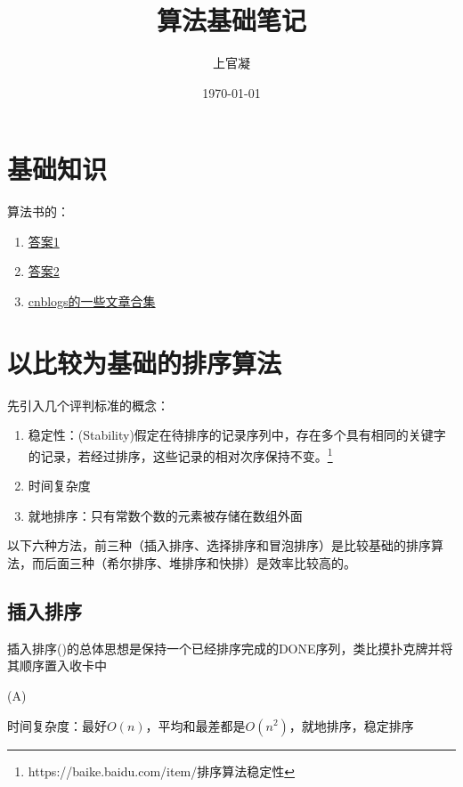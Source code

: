 \documentclass[]{report}
\title{{\huge {算法基础笔记}}}
\author{上官凝}
\date{\today}
\begin{document}
\theoremstyle{definition} \newtheorem{theorem}{Thm}[section] %
\theoremstyle{definition} \newtheorem{definition}{Def}[section] %
\theoremstyle{plain} \newtheorem{lemma}{lemma}[section] %

	\maketitle
	\newpage

	\tableofcontents
	\newpage

	\chapter{基础知识}
	算法书的：
	\begin{enumerate}
		\item \href{https://ita.skanev.com/08/03/02.html}{答案1}
		\item \href{https://sites.math.rutgers.edu/~ajl213/CLRS/CLRS.html}{答案2}
		\item \href{https://www.cnblogs.com/alantu2018/category/1163289.html}{cnblogs的一些文章合集}
	\end{enumerate}
	\chapter{以比较为基础的排序算法}
	先引入几个评判标准的概念：
	\begin{enumerate}
		\item 稳定性：(Stability)假定在待排序的记录序列中，存在多个具有相同的关键字的记录，若经过排序，这些记录的相对次序保持不变。\footnote{https://baike.baidu.com/item/排序算法稳定性}
		\item 时间复杂度
		\item 就地排序：只有常数个数的元素被存储在数组外面
	\end{enumerate}
	以下六种方法，前三种（插入排序、选择排序和冒泡排序）是比较基础的排序算法，而后面三种（希尔排序、堆排序和快排）是效率比较高的。
	\section{插入排序}
		插入排序({})的总体思想是保持一个已经排序完成的DONE序列，类比摸扑克牌并将其顺序置入收卡中
		\begin{algorithm}
			\caption{{}(A)}
		\end{algorithm}
		时间复杂度：最好$O(n)$，平均和最差都是$O(n^2)$，就地排序，稳定排序
\end{document}
